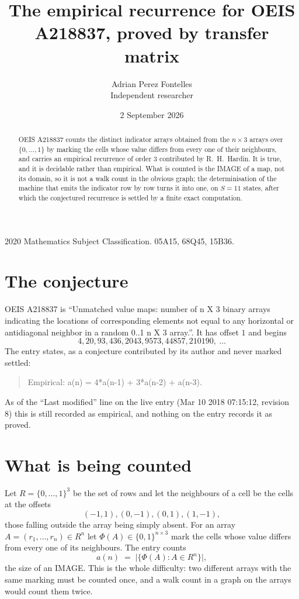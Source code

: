 \documentclass[11pt,a4paper]{article}
\title{The empirical recurrence for OEIS A218837, proved by transfer matrix}
\author{Adrian Perez Fontelles\\ \small Independent researcher}
\date{2 September 2026}
\theoremstyle{plain}
\theoremstyle{definition}
\begin{document}
\maketitle

\begin{abstract}
OEIS A218837 counts the distinct indicator arrays obtained from the $n\times3$ arrays over
$\{0,\dots,1\}$ by marking the cells whose value differs from every one of their neighbours, and carries an
empirical recurrence of order $3$ contributed by R.~H.~Hardin. It is true, and it is
decidable rather than empirical. What is counted is the IMAGE of a map, not its domain, so it
is not a walk count in the obvious graph; the determinisation of the machine that emits the
indicator row by row turns it into one, on $S=11$ states, after which the conjectured
recurrence is settled by a finite exact computation.
\end{abstract}

\noindent\small 2020 Mathematics Subject Classification. 05A15, 68Q45, 15B36.\normalsize

\section{The conjecture}

OEIS A218837 is ``Unmatched value maps: number of n X 3 binary arrays indicating the locations of corresponding elements not equal to any horizontal or antidiagonal neighbor in a random 0..1 n X 3 array.''. It has offset $1$ and begins
\[
4, 20, 93, 436, 2043, 9573, 44857, 210190,\ \dots
\]
The entry states, as a conjecture contributed by its author and never marked settled:
\begin{quote}
Empirical: a(n) = 4*a(n-1) + 3*a(n-2) + a(n-3).
\end{quote}
As of the ``Last modified'' line on the live entry (Mar 10 2018 07:15:12, revision 8) this is still
recorded as empirical, and nothing on the entry records it as proved.

\section{What is being counted}

Let $R=\{0,\dots,1\}^{3}$ be the set of rows and let the neighbours of a cell be the
cells at the offsets
\[
(-1,1), (0,-1), (0,1), (1,-1),
\]
those falling outside the array being simply absent. For an array
$A=(r_1,\dots,r_n)\in R^n$ let $\Phi(A)\in\{0,1\}^{n\times3}$ mark the cells whose value
differs from every one of its neighbours. The entry counts
\[
a(n)\;=\;\bigl|\{\Phi(A):A\in R^n\}\bigr| ,
\]
the size of an IMAGE. This is the whole difficulty: two different arrays with the same marking
must be counted once, and a walk count in a graph on the arrays would count them twice.
\end{document}
